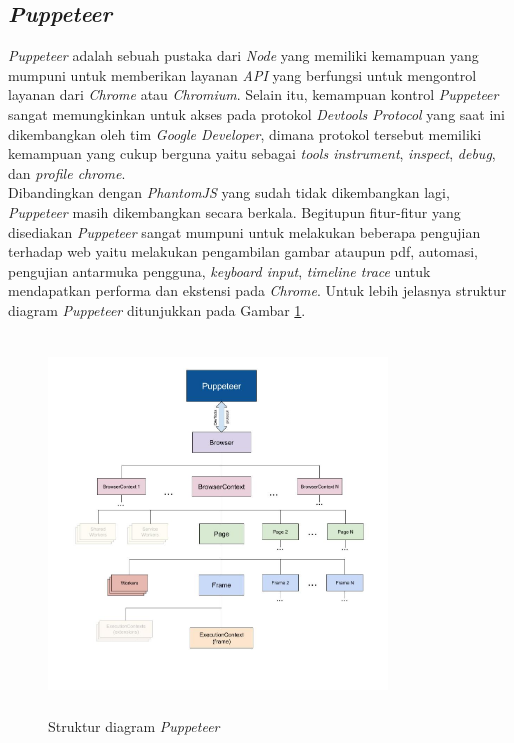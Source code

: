 		\subsection{\textit{Puppeteer}}
			\textit{Puppeteer} adalah sebuah pustaka dari \textit{Node} yang memiliki kemampuan yang mumpuni untuk memberikan layanan \textit{API} yang berfungsi untuk mengontrol layanan dari \textit{Chrome} atau \textit{Chromium}. Selain itu, kemampuan kontrol \textit{Puppeteer} sangat memungkinkan untuk akses pada protokol \textit{Devtools Protocol} yang saat ini dikembangkan oleh tim \textit{Google Developer}, dimana protokol tersebut memiliki kemampuan yang cukup berguna yaitu sebagai \textit{tools instrument}, \textit{inspect}, \textit{debug}, dan \textit{profile chrome}.\cite{puppeteer} \\
			\indent Dibandingkan dengan \textit{PhantomJS} yang sudah tidak dikembangkan lagi, \textit{Puppeteer} masih dikembangkan secara berkala. Begitupun fitur-fitur yang disediakan \textit{Puppeteer} sangat mumpuni untuk melakukan beberapa pengujian terhadap web yaitu melakukan pengambilan gambar ataupun pdf, automasi, pengujian antarmuka pengguna, \textit{keyboard input}, \textit{timeline trace} untuk mendapatkan performa dan ekstensi pada \textit{Chrome}. Untuk lebih jelasnya struktur diagram \textit{Puppeteer} ditunjukkan pada Gambar \ref{puppeteeroverview}.
			\begin{figure}[H]
				\centering
				\includegraphics[width=9cm,height=10cm]{Images/C-2/puppeteeroverview.jpg}
				\caption{Struktur diagram \textit{Puppeteer}}
				\label{puppeteeroverview}
			\end{figure}
			
